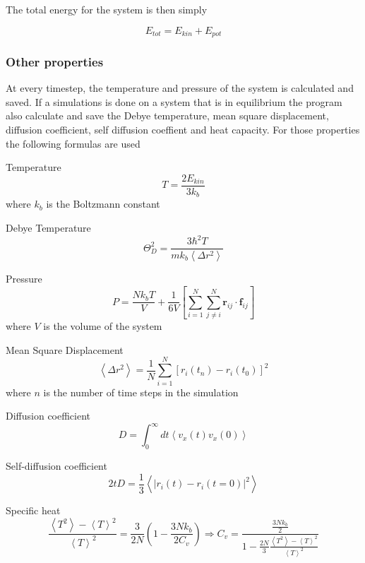 \documentclass[12pt,a4paper]{article}
\begin{document}
The total energy for the system is then simply

\begin{equation}
E_{tot} = E_{kin} + E_{pot}
\end{equation}

\subsubsection{Other properties}
At every timestep, the temperature and pressure of the system is calculated and saved. If a simulations is done on a system that is in equilibrium the program also calculate and save the Debye temperature, mean square displacement, diffusion coefficient, self diffusion coeffient and heat capacity. For those properties the following formulas are used

Temperature
\begin{equation}
\label{eq:temperature}
T=\frac{2E_{kin}}{3k_b}
\end{equation}
where \(k_b\) is the Boltzmann constant

Debye Temperature
\begin{equation}
\label{eq:debyetemperature}
\Theta_D^2=\frac{3 \hbar^2T}{mk_b \left< \Delta r^2\right>}
\end{equation}

Pressure
\begin{equation}
\label{eq:pressure}
P=\frac{Nk_bT}{V} + \frac 1 {6V} \left[\sum_{i=1}^N \sum_{j\not=i}^N  \mathbf r_{ij} \cdot \mathbf f_{ij} \right]
\end{equation}
where \(V\) is the volume of the system

Mean Square Displacement
\begin{equation}
\label{eq:MSD}
\left< \Delta r^2 \right>= \frac 1 N \sum_{i=1}^N \left[ r_i(t_n)-r_i(t_0) \right]^2
\end{equation}
where \( n\) is the number of time steps in the simulation

Diffusion coefficient
\begin{equation}
\label{eq:diffCoeff}
D= \int_0^\infty dt \left< v_x(t)v_x(0)\right>
\end{equation}

Self-diffusion coefficient
\begin{equation}
\label{eq:selfDiffCoeff}
2tD=\frac 1 3 \left<|r_i(t)-r_i(t=0)|^2 \right>
\end{equation}

Specific heat
\begin{equation}
\label{eq:specHeat}
\frac{\left< T^2\right> - \left< T \right>^2}{\left< T\right>^2} = \frac 3{2N} \left(1-\frac{3Nk_b}{2C_v} \right) \Rightarrow
C_v =\frac{\frac{3Nk_b} 2}{1-\frac{2N} 3 \frac{\left< T^2\right> - \left< T \right>^2}{\left< T\right>^2}}
\end{equation}
\end{document}
